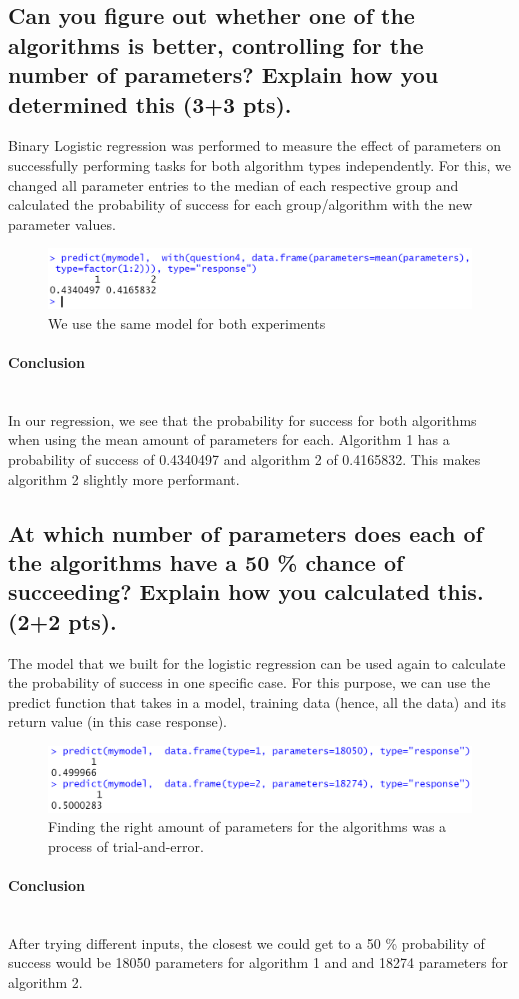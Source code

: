 \documentclass[14]{article}
\begin{document}
\subsection{Can you figure out whether one of the algorithms is better, controlling for the number of parameters? Explain how you determined this (3+3 pts).}
Binary Logistic regression was performed to measure the effect of parameters on successfully performing tasks for both algorithm types independently. For this, we changed all parameter entries to the median of each respective group and calculated the probability of success for each group/algorithm with the new parameter values.

\begin{figure}[!htb]
	\includegraphics[width=1.0\textwidth]{img/question4/question4_groups.PNG}
	\captionsetup{width=1.0\textwidth}
	\centering 
	\caption{We use the same model for both experiments}
\end{figure}\mbox{}

\paragraph{Conclusion}\mbox{}\\
In our regression, we see that the probability for success for both algorithms when using the mean amount of parameters for each. Algorithm 1 has a probability of success of 0.4340497 and algorithm 2 of 0.4165832. This makes algorithm 2 slightly more performant.

\subsection{At which number of parameters does each of the algorithms have a 50 \% chance of succeeding? Explain how you calculated this. (2+2 pts).}
The model that we built for the logistic regression can be used again to calculate the probability of success in one specific case. For this purpose, we can use the predict function that takes in a model, training data (hence, all the data) and its return value (in this case response).

\begin{figure}[!htb]
	\includegraphics[width=1.0\textwidth]{img/question4/R_50_Percent_Chance.PNG}
	\captionsetup{width=1.0\textwidth}
	\centering 
	\caption{Finding the right amount of parameters for the algorithms was a process of trial-and-error. }
\end{figure}
	
\paragraph{Conclusion}\mbox{}\\
After trying different inputs, the closest we could get to a 50 \% probability of success would be 18050 parameters for algorithm 1 and and 18274 parameters for algorithm 2.
\end{document}
